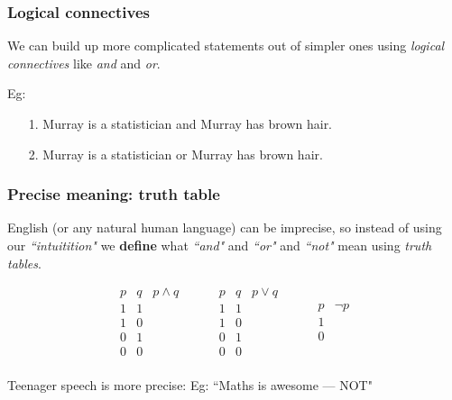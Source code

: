 \documentclass[10pt]{beamer}
\theoremstyle{definition}
\begin{document}
\begin{frame}
\frametitle{Logical connectives}

We can build up more complicated statements out of simpler ones using  
{\em logical connectives} like {\em and} and {\em or}.

\bigskip

Eg: 
\begin{enumerate}
\item[1.] 
Murray is a statistician and Murray  has brown hair.
\item[2.] 
Murray is a statistician or Murray  has brown hair.
\end{enumerate}
\vspace{2cm}
\vfill
\end{frame}


\begin{frame}
\frametitle{Precise meaning: truth table}

English (or any natural human language) can be imprecise, so instead of using our 
{\em ``intuitition"} we \textbf{define} what  {\em ``and"} and {\em ``or"} and {\em ``not"} mean using {\em truth tables}.

\pause\bigskip
\[\begin{array}{c|c|ccc}
 p & q & p\wedge q\\
 \hline
 1 & 1 & \\
 1 & 0 & \\
 0& 1 & \\
 0 & 0 & \\
\end{array} \hspace{1cm} \begin{array}{c|c|ccc}
 p & q & p\vee q\\
 \hline
 1 & 1 & \\
 1 & 0 & \\
 0& 1 & \\
 0 & 0 & \\
\end{array}  \hspace{1cm}\begin{array}{c|cccc}
 p &  \neg p\\
 \hline
 1 &  \\
 0&   \\
\end{array}\]


\bigskip\pause

Teenager speech is more precise: Eg:
``Maths is awesome --- NOT"  



\vspace{0cm}
\vfill
\end{frame}
\end{document}
